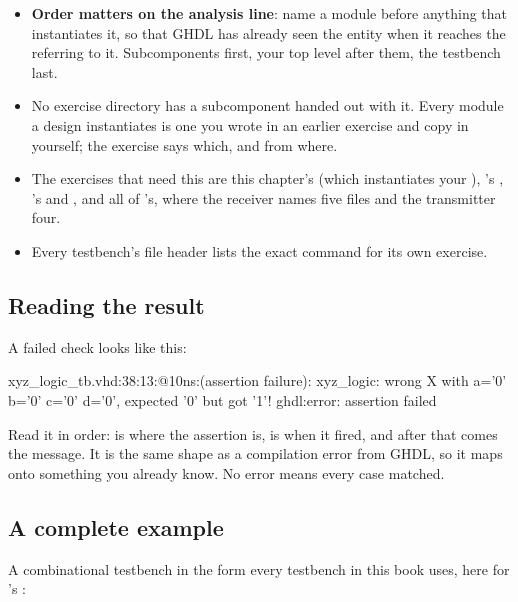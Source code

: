\begin{itemize}
  \item \textbf{Order matters on the analysis line}: name a module before anything that
    instantiates it, so that GHDL has already seen the entity when it reaches the
     referring to it. Subcomponents first, your top level after them, the
    testbench last.
  \item No exercise directory has a subcomponent handed out with it. Every module a design
    instantiates is one you wrote in an earlier exercise and copy in yourself; the exercise says
    which, and from where.
  \item The exercises that need this are this chapter's  (which instantiates your
    ), 's , 's 
    and , and all of 's, where the receiver names five files and
    the transmitter four.
  \item Every testbench's file header lists the exact command for its own exercise.
\end{itemize}

\subsection{Reading the result}
\label{c2:sub:result}
A failed check looks like this:

\begin{console}
xyz_logic_tb.vhd:38:13:@10ns:(assertion failure): xyz_logic: wrong X with a='0' b='0' c='0' d='0', expected '0' but got '1'!
ghdl:error: assertion failed
\end{console}

Read it in order:  is where the assertion is,  is when it fired, and
after that comes the message. It is the same shape as a compilation error from GHDL, so it maps
onto something you already know. No error means every case matched.

\subsection{A complete example}
\label{c2:sub:example}
A combinational testbench in the form every testbench in this book uses, here for
's :

